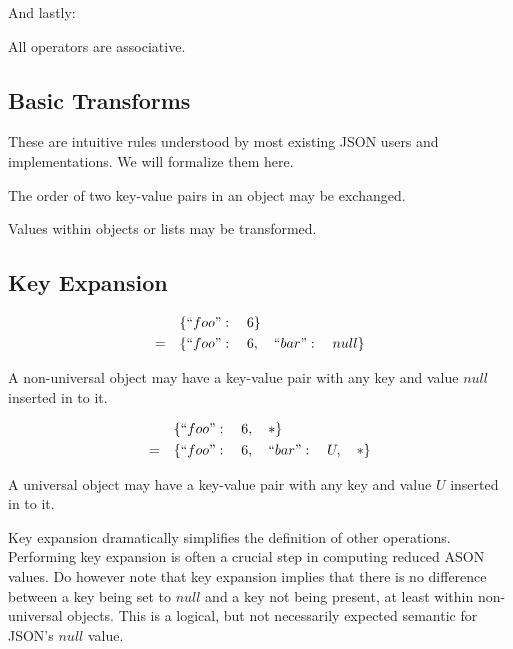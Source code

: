 \documentclass[letterpaper]{article}
\begin{document}
And lastly:
%
\begin{prule}
All operators are associative.
\end{prule}

\subsection{Basic Transforms}
These are intuitive rules understood by most existing JSON users and
implementations. We will formalize them here.

\begin{prule}
The order of two key-value pairs in an object may be exchanged.
\end{prule}

\begin{prule}
Values within objects or lists may be transformed.
\end{prule}

\subsection{Key Expansion}
\begin{prule}
\begin{equation}
\begin{split}
& \{``foo":\quad6 \}\\
= \quad& \{``foo":\quad6,\quad ``bar":\quad null\}
\end{split}
\end{equation}

A non-universal object may have a key-value pair with any key and value
\(null\) inserted in to it.
\end{prule}

\begin{prule}
\begin{equation}
\begin{split}
& \{``foo":\quad6,\quad *\}\\
= \quad& \{``foo":\quad6,\quad ``bar":\quad U,\quad *\}
\end{split}
\end{equation}

A universal object may have a key-value pair with any key and value \(U\)
inserted in to it.
\end{prule}

Key expansion dramatically simplifies the definition of other operations.
Performing key expansion is often a crucial step in computing reduced ASON
values. Do however note that key expansion implies that there is no difference
between a key being set to \(null\) and a key not being present, at least
within non-universal objects. This is a logical, but not necessarily expected
semantic for JSON's \(null\) value.
\end{document}
